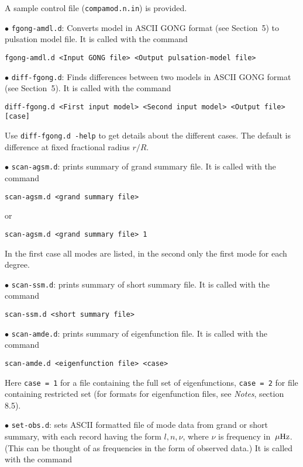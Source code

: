 \item{}
A sample control file ({\tt compamod.n.in}) is provided.

\medskip
\item{$\bullet$}
{\tt fgong-amdl.d}:
Converts model in ASCII GONG format (see Section~5)
to pulsation model file.
It is called with the command

{\tt fgong-amdl.d <Input GONG file> <Output pulsation-model file>}

\medskip
\item{$\bullet$}
{\tt diff-fgong.d}:
Finds differences between two models in ASCII GONG format (see Section~5).
It is called with the command

{\tt diff-fgong.d <First input model> <Second input model> <Output file> [case]}

\item{}
Use {\tt diff-fgong.d -help} to get details about the different cases.
The default is difference at fixed fractional radius $r/R$.

\bigskip
\item{$\bullet$}
{\tt scan-agsm.d}: prints summary of grand summary file.
It is called with the command

{\tt scan-agsm.d <grand summary file>}

\item{}
or

{\tt scan-agsm.d <grand summary file> 1}

\item{}
In the first case all modes are listed, in the second only the
first mode for each degree.

\medskip
\item{$\bullet$}
{\tt scan-ssm.d}: prints summary of short summary file.
It is called with the command

{\tt scan-ssm.d <short summary file>}

\medskip
\item{$\bullet$}
{\tt scan-amde.d}: prints summary of eigenfunction file.
It is called with the command

{\tt scan-amde.d <eigenfunction file> <case>}

\item{}
Here {\tt case = 1} for a file containing the full set
of eigenfunctions, {\tt case = 2} for file containing
restricted set
(for formats for eigenfunction files, see
{\it Notes}, section 8.5).

\medskip
\item{$\bullet$}
{\tt set-obs.d}: sets ASCII formatted file of mode data
from grand or short summary, with each record having
the form $l, n, \nu$, where $\nu$ is frequency in $\,\mu {\rm Hz}$.
(This can be thought of as frequencies in the form of
observed data.)
It is called with the command

